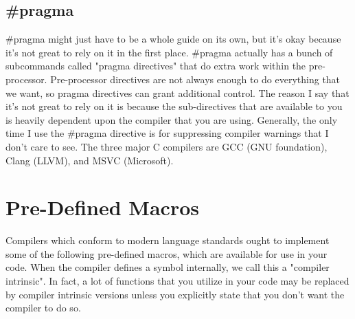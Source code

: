 \documentclass{article}
\begin{document}
\subsection{\#pragma}

\#pragma might just have to be a whole guide on its own, but it's okay because it's not great to rely on it in
the first place. \#pragma actually has a bunch of subcommands called "pragma directives" that do extra work
within the pre-processor. Pre-processor directives are not always enough to do everything that we want, so
pragma directives can grant additional control. The reason I say that it's not great to rely on it is because
the sub-directives that are available to you is heavily dependent upon the compiler that you are using.
Generally, the only time I use the \#pragma directive is for suppressing compiler warnings that I don't care
to see. The three major C compilers are GCC (GNU foundation), Clang (LLVM), and MSVC (Microsoft).

\section{Pre-Defined Macros}

Compilers which conform to modern language standards ought to implement some of the following pre-defined
macros, which are available for use in your code. When the compiler defines a symbol internally, we call this
a "compiler intrinsic". In fact, a lot of functions that you utilize in your code may be replaced by compiler
intrinsic versions unless you explicitly state that you don't want the compiler to do so.
\end{document}
